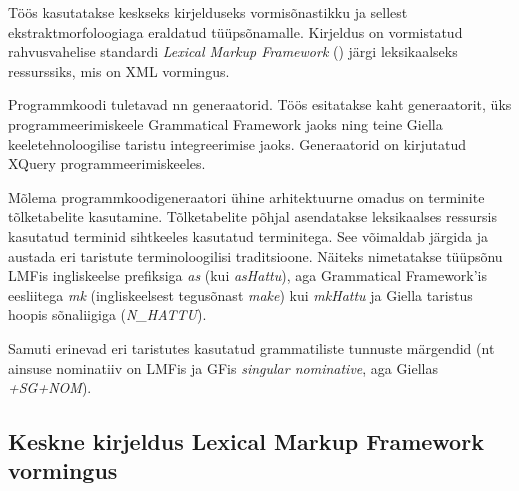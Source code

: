 \documentclass[12pt,a4paper]{article}
\begin{document}
Töös kasutatakse keskseks kirjelduseks vormisõnastikku ja sellest ekstrakt\-morfoloogiaga eraldatud tüüpsõna\-malle. Kirjeldus on vormistatud rahvusvahelise standardi \textit{Lexical Markup Framework} (\cite{iso/tc_37/sc_4_language_2007}) järgi leksikaalseks ressurssiks, mis on XML vormingus.

Programmkoodi tuletavad nn generaatorid. Töös esitatakse kaht generaatorit, üks programmeerimiskeele Grammatical Framework jaoks ning teine Giella keeletehnoloogilise taristu integreerimise jaoks. Generaatorid on kirjutatud XQuery programmeerimiskeeles.

Mõlema programmkoodi\-generaatori ühine arhitektuurne omadus on terminite tõlke\-tabelite kasutamine. Tõlke\-tabelite põhjal asendatakse leksikaalses ressursis kasutatud terminid sihtkeeles kasutatud terminitega. See võimaldab järgida ja austada eri taristute terminoloogilisi traditsioone. Näiteks nimetatakse tüüpsõnu LMFis ingliskeelse prefiksiga \textit{as} (kui \textit{asHattu}), aga Grammatical Framework'is eesliitega \textit{mk} (inglis\-keelsest tegusõnast \textit{make}) kui \textit{mkHattu} ja Giella taristus hoopis sõnaliigiga (\textit{N\_HATTU}).

Samuti erinevad eri taristutes kasutatud grammatiliste tunnuste märgendid (nt ainsuse nominatiiv on LMFis ja GFis \textit{singular nominative}, aga Giellas \textit{+SG+NOM}).



\subsection{Keskne kirjeldus Lexical Markup Framework vormingus}
\label{sec:lmf}
\end{document}
